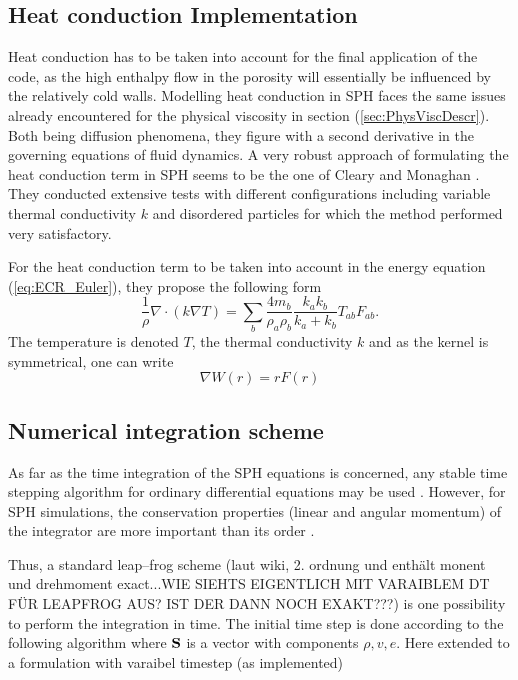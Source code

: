 \documentclass{report}
\begin{document}
\subsection{Heat conduction Implementation}
\label{sec:HeatCondImplementation}
Heat conduction has to be taken into account for the final application of the code, as the high enthalpy flow in the porosity will essentially be influenced by the relatively cold walls. 
Modelling heat conduction in SPH faces the same issues already encountered for the physical viscosity  in section (\ref{sec:PhysViscDescr}). Both being diffusion phenomena, they figure with a second derivative in the governing equations of fluid dynamics. 
A very robust approach of formulating the heat conduction term in SPH seems to be the one of Cleary and Monaghan \cite{Cleary1999}. They conducted extensive tests with different configurations including variable thermal conductivity $k$ and disordered particles for which the method performed very satisfactory.

For the heat conduction term to be taken into account in the energy equation (\ref{eq:ECR_Euler}), they propose the following form
\begin{equation}
 \label{eq:heatConductionTerm}
\frac{1}{\rho}\nabla \cdot (k \nabla T)=\sum_b\frac{4 m_b}{\rho_a \rho_b} \frac{k_a k_b}{k_a + k_b} T_{ab} F_{ab}.
\end{equation}
The temperature is denoted $T$, the thermal conductivity $k$ and as the kernel is symmetrical, one can write 
\begin{equation}
 \label{eq:gradWexpressedAsF}
\nabla W(r)=r F(r)
\end{equation}

\subsection{Numerical integration scheme}
\label{sec:numIntegr}

As far as the time integration of the SPH equations is concerned, any stable
time stepping algorithm for ordinary differential equations may be
used \cite{Monaghan2005}. However, for SPH simulations, the conservation properties
(linear and angular momentum) of the integrator are more important than its
order \cite{Monaghan2005}.

Thus, a standard leap--frog scheme (laut wiki, 2. ordnung und enthält monent und drehmoment exact...WIE SIEHTS EIGENTLICH MIT VARAIBLEM DT FÜR LEAPFROG AUS? IST DER DANN NOCH EXAKT???) is one possibility to perform the integration in
time. The initial time step is done according to the following algorithm where
${\bf S}$ is a vector with components  $\rho,v,e$.
Here extended to a formulation with varaibel timestep (as implemented)
\end{document}
